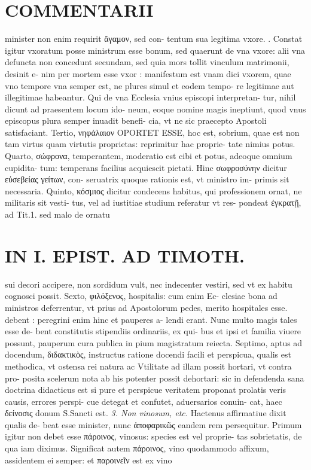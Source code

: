 \documentclass{article}
\begin{document}
\begin{pages}
\section*{COMMENTARII }
\marginpar{[ p.64 ]}\pstart minister non enim requirit ἄγαμον, sed con- tentum sua legitima vxore. .  \pend\pstart Constat igitur vxoratum posse ministrum esse bonum, sed quaerunt de vna vxore: alii vna defuncta non concedunt secundam, sed quia mors tollit vinculum matrimonii, desinit e- nim per mortem esse vxor : manifestum est vnam dici vxorem, quae vno tempore vna semper est, ne plures simul et eodem tempo- re legitimae aut illegitimae habeantur. Qui de vna Ecclesia vnius episcopi interpretan- tur, nihil dicunt ad praesentem locum ido- neum, eoque nomine magis ineptiunt, quod vnus episcopus plura semper inuadit benefi- cia, vt ne sic praecepto Apostoli satisfaciant.  \pend\pstart Tertio, νηφάλαιον OPORTET ESSE, hoc est, sobrium, quae est non tam virtus quam virtutis proprietas: reprimitur hac proprie- tate nimius potus.  \pend\pstart Quarto, σώφρονα, temperantem, moderatio est cibi et potus, adeoque omnium cupidita- tum: temperans facilius acquiescit pietati. Hinc σωφροσύνην dicitur εὐσεβείας γείτων, con- seruatrix quoque rationis est, vt ministro im- primis sit necessaria.  \pend\pstart Quinto, κόσμιος dicitur condecens habitus, qui professionem ornat, ne militaris sit vesti- tus, vel ad iustitiae studium referatur vt res- pondeat ἐγκρατῇ, ad Tit.1. sed malo de ornatu  \pend
\section*{IN I. EPIST. AD TIMOTH. }
\marginpar{[ p.65 ]}\pstart sui decori accipere, non sordidum vult, nec indecenter vestiri, sed vt ex habitu cognosci possit.  \pend\pstart Sexto, φιλόξενος, hospitalis: cum enim Ec- clesiae bona ad ministros deferrentur, vt prius ad Apostolorum pedes, merito hospitales esse. debent : peregrini enim hinc et pauperes a- lendi erant. Nunc multo magis tales esse de- bent constitutis stipendiis ordinariis, ex qui- bus et ipsi et familia viuere possunt, pauperum cura publica in pium magistratum reiecta. Septimo, aptus ad docendum, διδακτικὸς, instructus ratione docendi facili et perspicua, qualis est methodica, vt ostensa rei natura ac Vtilitate ad illam possit hortari, vt contra pro- posita scelerum nota ab his potenter possit dehortari: sic in defendenda sana doctrina didacticus est si pure et perspicue veritatem proponat prolatis veris causis, errores perspi- cue detegat et confutet, aduersarios conuin- cat, haec δείνοσις donum S.Sancti est.  \pend
\textit{3. Non vinosum, etc. }\pstart Hactenus affirmatiue dixit qualis de- beat esse minister, nunc ἀποφαρικῶς eandem rem persequitur. Primum igitur non debet esse πάροινος, vinosus: species est vel proprie- tas sobrietatis, de qua iam diximus. Significat autem πάροινος, vino quodammodo affixum, assidentem ei semper: et παροινεῖν est ex vino  \pend

\end{pages}
\end{document}
